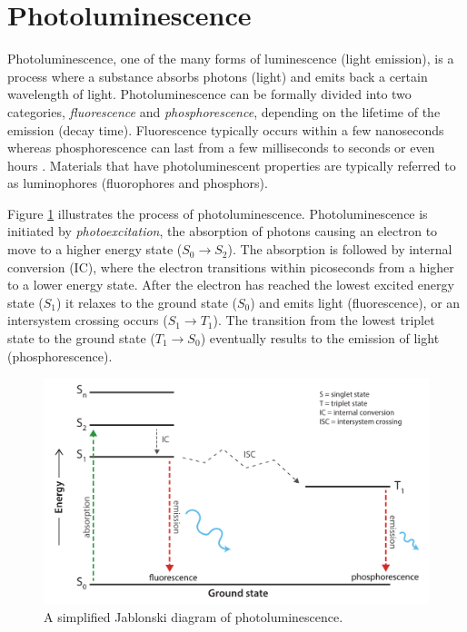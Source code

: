 \documentclass[thesis.tex]{subfiles}
\begin{document}
\section{Photoluminescence}
\label{section:photoluminescence}

Photoluminescence, one of the many forms of luminescence (light emission), is a process where a substance absorbs photons (light) and emits back a certain wavelength of light. Photoluminescence can be formally divided into two categories, \emph{fluorescence} and \emph{phosphorescence}, depending on the lifetime of the emission (decay time). Fluorescence typically occurs within a few nanoseconds whereas phosphorescence can last from a few milliseconds to seconds or even hours \cite{luminescence_basics}. Materials that have photoluminescent properties are typically referred to as luminophores (fluorophores and phosphors).

Figure \ref{figure:photoluminescence} illustrates the process of photoluminescence. Photoluminescence is initiated by \emph{photoexcitation}, the absorption of photons causing an electron to move to a higher energy state ($S_0 \rightarrow S_2$). The absorption is followed by internal conversion (IC), where the electron transitions within picoseconds from a higher to a lower energy state. After the electron has reached the lowest excited energy state ($S_1$) it relaxes to the ground state ($S_0$) and emits light (fluorescence), or an intersystem crossing occurs ($S_1 \rightarrow T_1$). The transition from the lowest triplet state to the ground state ($T_1 \rightarrow S_0$) eventually results to the emission of light (phosphorescence).

\begin{figure}[hb]
\centering \includegraphics[width=\textwidth]{images/photoluminescence.pdf}
\caption{A simplified Jablonski diagram of photoluminescence. \label{figure:photoluminescence}}
\end{figure}
\end{document}
